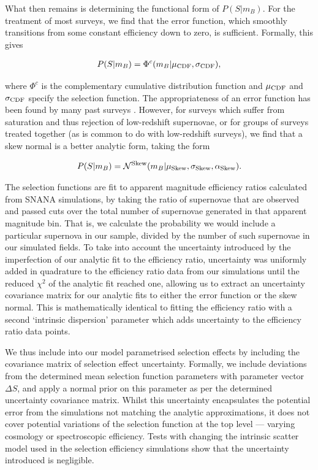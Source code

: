 \documentclass[a4paper,fleqn,usenatbib]{emulateapj}
\begin{document}
What then remains is determining the functional form of $P(S|m_B)$. For the treatment of most surveys, we find that the error function, which smoothly transitions from some constant efficiency down to zero, is sufficient. Formally, this gives

\begin{align}
P(S|m_B) = \Phi^c(m_B | \mu_{\rm CDF}, \sigma_{\rm CDF}),
\end{align}

where $\Phi^c$ is the complementary cumulative distribution function and $\mu_{\rm CDF}$ and $\sigma_{\rm CDF}$ specify the selection function. The appropriateness of an error function has been found by many past surveys \citep{Dilday2008, Barbary2010, Perrett2012, Graur2013, Rodney2014}. However, for surveys which suffer from saturation and thus rejection of low-redshift supernovae, or for groups of surveys treated together (as is common to do with low-redshift surveys), we find that a skew normal is a better analytic form, taking the form

\begin{align}
P(S|m_B) = \mathcal{N}^{{\rm Skew}}(m_B | \mu_{\rm Skew}, \sigma_{\rm Skew}, \alpha_{\rm Skew}).
\end{align}


The selection functions are fit to apparent magnitude efficiency ratios calculated from SNANA simulations, by taking the ratio of supernovae that are observed and passed cuts over the total number of supernovae generated in that apparent magnitude bin. That is, we calculate the probability we would include a particular supernova in our sample, divided by the number of such supernovae in our simulated fields. To take into account the uncertainty introduced by the imperfection of our analytic fit to the efficiency ratio, uncertainty was uniformly added in quadrature to the efficiency ratio data from our simulations until the reduced $\chi^2$ of the analytic fit reached one, allowing us to extract an uncertainty covariance matrix for our analytic fits to either the error function or the skew normal. This is mathematically identical to fitting the efficiency ratio with a second `intrinsic dispersion' parameter which adds uncertainty to the efficiency ratio data points.

We thus include into our model parametrised selection effects by including the covariance matrix of selection effect uncertainty. Formally, we include deviations from the determined mean selection function parameters with parameter vector $\Delta S$, and apply a normal prior on this parameter as per the determined uncertainty covariance matrix.  Whilst this uncertainty encapsulates the potential error from the simulations not matching the analytic approximations, it does not cover potential variations of the selection function at the top level --- varying cosmology or spectroscopic efficiency. Tests with changing the intrinsic scatter model used in the selection efficiency simulations show that the uncertainty introduced is negligible.
\end{document}
